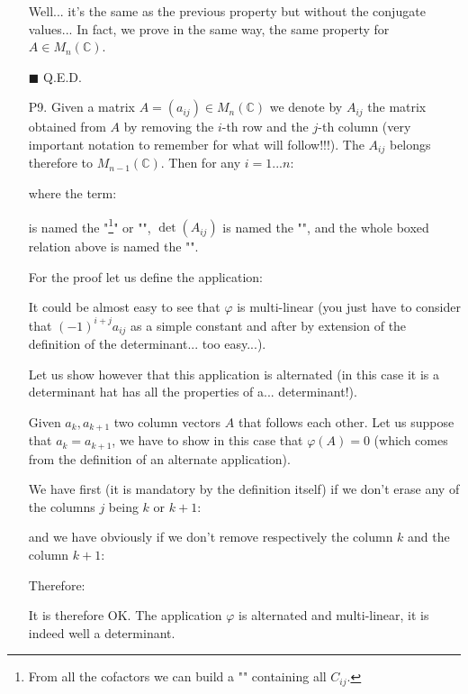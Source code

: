 \begin{enumerate}
		\begin{dem}
		Well... it's the same as the previous property but without the conjugate values... In fact, we prove in the same way, the same property for $A\in M_n(\mathbb{C})$.
		\begin{flushright}
			$\blacksquare$  Q.E.D.
		\end{flushright}
		\end{dem}
		
		\item[P9.] Given a matrix $A=(a_{ij})\in M_n(\mathbb{C})$ we denote by $A_{ij}$ the matrix obtained from $A$ by removing the $i$-th row and the $j$-th column (very important notation to remember for what will follow!!!). The $A_{ij}$ belongs therefore to $M_{n-1}(\mathbb{C})$. Then for any $i=1...n$:
		
		where the term:
		
		is named the "\label{cofactor}\footnote{From all the cofactors we can build a "" containing all $C_{ij}$.}" or "\label{partial determinant}", $\det(A_{ij})$ is named the "", and the whole boxed relation above is named the "\index{cofactor expansion theorem}".
		\begin{dem}
		For the proof let us define the application:
		
		It could be almost easy to see that $\varphi$ is multi-linear (you just have to consider that $(-1)^{i+j}a_{ij}$ as a simple constant and after by extension of the definition of the determinant... too easy...).

		Let us show however that this application is alternated (in this case it is a determinant hat has all the properties of a... determinant!).
	
		Given $a_k,a_{k+1}$ two column vectors $A$ that follows each other. Let us suppose that $a_k=a_{k+1}$, we have to show in this case that $\varphi(A)=0$ (which comes from the definition of an alternate application).
	
		We have first (it is mandatory by the definition itself) if we don't erase any of the columns $j$ being $k$ or $k+1$:
		
		and we have obviously if we don't remove respectively the column $k$ and the column $k+1$:
		
		Therefore:
		
		It is therefore OK. The application $\varphi$ is alternated and multi-linear, it is indeed well a determinant.
		

\end{dem}
\end{enumerate}
